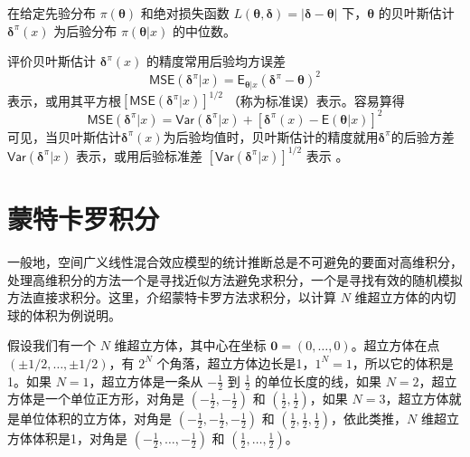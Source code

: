 \documentclass[12pt,a4paper,UTF8,twoside]{book}
\theoremstyle{definition}
\theoremstyle{definition}
\theoremstyle{definition}
\theoremstyle{remark}
\let\BeginKnitrBlock\begin \let\EndKnitrBlock\end
\begin{document}
\BeginKnitrBlock{theorem}[绝对值损失]
\protect\hypertarget{thm:bayes-estimate-abs}{}{\label{thm:bayes-estimate-abs}
{} }在给定先验分布 \(\pi(\boldsymbol{\theta})\)
和绝对损失函数
\(L(\boldsymbol{\theta},\boldsymbol{\delta}) = |\boldsymbol{\delta} - \boldsymbol{\theta}|\)
下，\(\boldsymbol{\theta}\) 的贝叶斯估计
\(\boldsymbol{\delta}^{\pi}(x)\) 为后验分布
\(\pi(\boldsymbol{\theta}|x)\) 的中位数。
\EndKnitrBlock{theorem}

评价贝叶斯估计 \(\boldsymbol{\delta}^{\pi}(x)\) 的精度常用后验均方误差
\[\mathsf{MSE}(\boldsymbol{\delta}^{\pi}|x) = \mathsf{E}_{\boldsymbol{\theta}|x}(\boldsymbol{\delta}^{\pi} - \boldsymbol{\theta})^2\]
表示，或用其平方根\([\mathsf{MSE}(\boldsymbol{\delta}^{\pi}|x)]^{1/2}\)
（称为标准误）表示。容易算得
\[\mathsf{MSE}(\boldsymbol{\delta}^{\pi}|x) = \mathsf{Var}(\boldsymbol{\delta}^{\pi}|x) + [\boldsymbol{\delta}^{\pi}(x) - \mathsf{E}(\boldsymbol{\theta}|x)]^2\]
可见，当贝叶斯估计\(\boldsymbol{\delta}^{\pi}(x)\)为后验均值时，贝叶斯估计的精度就用\(\boldsymbol{\delta}^{\pi}\)的后验方差\(\mathsf{Var}(\boldsymbol{\delta}^{\pi}|x)\)
表示，或用后验标准差
\([\mathsf{Var}(\boldsymbol{\delta}^{\pi}|x)]^{1/2}\) 表示
\citep{mao2006}。

\hypertarget{Curse-of-Dimensionality}{%
\section{蒙特卡罗积分}\label{Curse-of-Dimensionality}}

一般地，空间广义线性混合效应模型的统计推断总是不可避免的要面对高维积分，处理高维积分的方法一个是寻找近似方法避免求积分，一个是寻找有效的随机模拟方法直接求积分。这里，介绍蒙特卡罗方法求积分，以计算
\(N\) 维超立方体的内切球的体积为例说明。

假设我们有一个 \(N\) 维超立方体，其中心在坐标
\(\mathbf{0} = (0,\ldots,0)\)。超立方体在点
\((\pm 1/2,\ldots,\pm 1/2)\)，有 \(2^{N}\)
个角落，超立方体边长是1，\(1^{N}=1\)，所以它的体积是1。如果
\(N=1\)，超立方体是一条从 \(-\frac{1}{2}\) 到 \(\frac{1}{2}\)
的单位长度的线，如果 \(N=2\)，超立方体是一个单位正方形，对角是
\(\left( -\frac{1}{2}, -\frac{1}{2} \right)\) 和
\(\left( \frac{1}{2}, \frac{1}{2} \right)\)，如果
\(N=3\)，超立方体就是单位体积的立方体，对角是
\(\left( -\frac{1}{2}, -\frac{1}{2}, -\frac{1}{2} \right)\) 和
\(\left( \frac{1}{2}, \frac{1}{2}, \frac{1}{2} \right)\)，依此类推，\(N\)
维超立方体体积是1，对角是
\(\left( -\frac{1}{2}, \ldots, -\frac{1}{2} \right)\) 和
\(\left( \frac{1}{2}, \ldots, \frac{1}{2} \right)\)。
\end{document}
